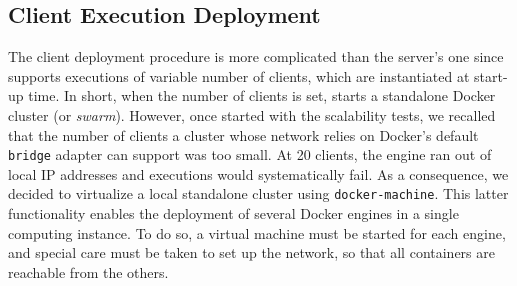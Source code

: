 \subsection{Client Execution Deployment} \label{sec:deployment:client}

The client deployment procedure is more complicated than the server's one since \projName supports executions of variable number of clients, which are instantiated at start-up time.
In short, when the number of clients is set, \projName starts a standalone Docker cluster (or \emph{swarm}).
However, once started with the scalability tests, we recalled that the number of clients a cluster whose network relies on Docker's default \texttt{bridge} adapter can support was too small.
At 20 clients, the engine ran out of local IP addresses and executions would systematically fail.
As a consequence, we decided to virtualize a local standalone cluster using \texttt{docker-machine}.
This latter functionality enables the deployment of several Docker engines in a single computing instance.
To do so, a virtual machine must be started for each engine, and special care must be taken to set up the network, so that all containers are reachable from the others.

